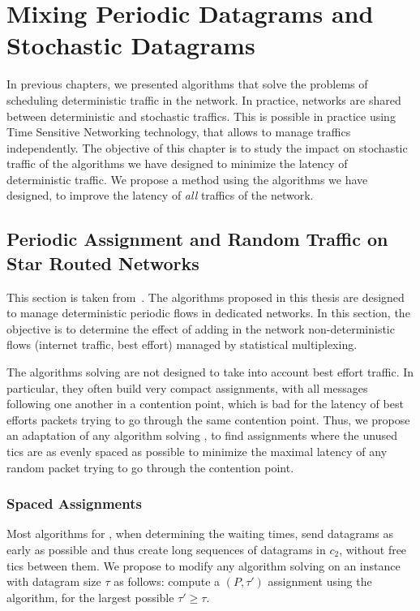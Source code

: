 
\chapter{Mixing Periodic Datagrams and Stochastic Datagrams}
\label{chap:BE}
\minitoc


In previous chapters, we presented algorithms that solve the problems of scheduling deterministic traffic in the network. In practice, networks are shared between deterministic and stochastic traffics. This is possible in practice using Time Sensitive Networking technology, that allows to manage traffics independently. The objective of this chapter is to study the impact on stochastic traffic of the algorithms we have designed to minimize the latency of deterministic traffic. We propose a method using the algorithms we have designed, to improve the latency of \emph{all} traffics of the network.

\section{Periodic Assignment and Random Traffic on Star Routed Networks}\label{sec:comparison}

	This section is taken from~\cite{DBLP:journals/corr/abs-1801-07029}.
    The algorithms proposed in this thesis are designed to manage deterministic periodic flows in dedicated networks. In this section, the objective is to determine the effect of adding in the network non-deterministic flows (internet traffic, best effort) managed by statistical multiplexing.

    The algorithms solving \pall are not designed to take into account best effort traffic. In particular, they often build very compact assignments, with all messages following one another in a contention point, which is bad for the latency of best efforts packets trying to go through the same contention point. Thus, we propose an adaptation of any algorithm solving \pall, to find assignments where the unused tics are as evenly spaced as possible to minimize the maximal latency of any random packet trying to go through the contention point. 
    
    
    \subsection{Spaced Assignments}

    Most algorithms for \pall, when determining the waiting times, send datagrams as early as possible
    and thus create long sequences of datagrams in $c_2$, without free tics between them. We propose to modify any algorithm solving \pall on an instance with datagram size $\tau$ as follows: compute a $(P,\tau')$ assignment using the algorithm, for the largest possible $\tau' \geq \tau$. 

